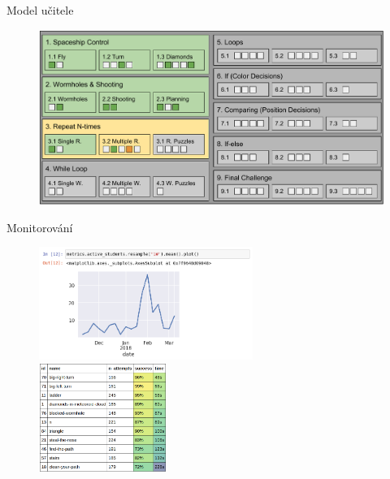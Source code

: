 \documentclass[
]{beamer}
\begin{document}
\begin{frame}{Model učitele}
\begin{figure}
\includegraphics[width=\textwidth,height=.75\textheight,keepaspectratio]{../img/robomission-tutor-model}
\end{figure}
\end{frame}

\begin{frame}{Monitorování}
\begin{figure}
\includegraphics[width=0.62\textwidth]{../img/dashboard-metrics}
\includegraphics[width=0.37\textwidth]{../img/monitoring-notebook-repeat}
\end{figure}
\end{frame}
\end{document}
